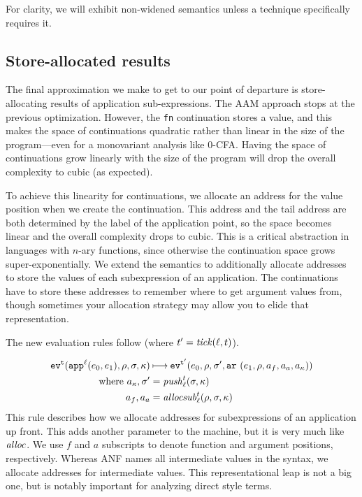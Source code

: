 \documentclass[preprint,onecolumn,9pt]{sigplanconf} %
\begin{document}
For clarity, we will exhibit non-widened semantics unless a technique
specifically requires it.

\subsection{Store-allocated results}
\label{sec:baselineeval}

The final approximation we make to get to our point of departure is
store-allocating results of application sub-expressions. 
The AAM approach stops at the previous optimization. 
However, the {\tt fn} continuation stores a value, and this makes the space of
continuations quadratic rather than linear in the size of the program---even for a monovariant analysis like 0-CFA.
Having the space of continuations grow linearly with the size of the program 
will drop the overall complexity to cubic (as expected).

To achieve this linearity for continuations, we allocate an address
for the value position when we create the continuation.  This address
and the tail address are both determined by the label of the
application point, so the space becomes linear and the overall
complexity drops to cubic.  This is a critical abstraction in
languages with $n$-ary functions, since otherwise the continuation
space grows super-exponentially. We extend the semantics to
additionally allocate addresses to store the values of each
subexpression of an application. The continuations have to store these
addresses to remember where to get argument values from, though
sometimes your allocation strategy may allow you to elide that
representation.

The new evaluation rules follow (where $\mcntr' = \tick(\mlab,\mcntr)$).

\newcommand{\ext}[3]{#1\sqcup[#2\mapsto#3]}

\begin{align*}
\ev[^\mcntr]{\sapp[^\mlab]{\mexpi0}{\mexpi1},\menv,\msto,\mkont} &\machstep
\ev[^{\mcntr'}]{\mexpi{0},\menv,\msto',\kar{\mexpi{1},\menv,\maddr_f,\maddr_a,\maddr_\mkont}} \\
\text{ where }
  \maddr_\mkont,\msto' &= \push^\mcntr_\mlab(\msto,\mkont) \\
  \maddr_f,\maddr_a &= \allocsub^\mcntr_\mlab(\menv,\msto,\mkont)
\end{align*}
This rule describes how we allocate addresses for subexpressions of an
application up front. This adds another parameter to the machine, but
it is very much like $\alloc$. We use $f$ and $a$ subscripts to denote
function and argument positions, respectively. Whereas ANF names all
intermediate values in the syntax, we allocate addresses for
intermediate values. This representational leap is not a big one, but
is notably important for analyzing direct style terms.
\end{document}
